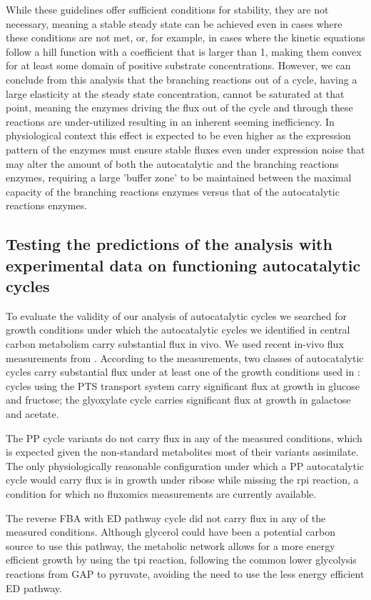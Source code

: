     While these guidelines offer sufficient conditions for stability, they are not necessary, meaning a stable steady state can be achieved even in cases where these conditions are not met, or, for example, in cases where the kinetic equations follow a hill function with a coefficient that is larger than 1, making them convex for at least some domain of positive substrate concentrations.
    However, we can conclude from this analysis that the branching reactions out of a cycle, having a large elasticity at the steady state concentration, cannot be saturated at that point, meaning the enzymes driving the flux out of the cycle and through these reactions are under-utilized resulting in an inherent seeming inefficiency.
    In physiological context this effect is expected to be even higher as the expression pattern of the enzymes must ensure stable fluxes even under expression noise that may alter the amount of both the autocatalytic and the branching reactions enzymes, requiring a large 'buffer zone' to be maintained between the maximal capacity of the branching reactions enzymes versus that of the autocatalytic reactions enzymes.

    \subsection{Testing the predictions of the analysis with experimental data on functioning autocatalytic cycles}
    To evaluate the validity of our analysis of autocatalytic cycles we searched for growth conditions under which the autocatalytic cycles we identified in central carbon metabolism carry substantial flux in vivo.
    We used recent in-vivo flux measurements from \cite{Gerosa2015-oq}.  
    According to the measurements, two classes of autocatalytic cycles carry substantial flux under at least one of the growth conditions used in \cite{Gerosa2015-oq}:
    cycles using the PTS transport system carry significant flux at growth in glucose and fructose;
    the glyoxylate cycle carries significant flux at growth in galactose and acetate.

    The PP cycle variants do not carry flux in any of the measured conditions, which is expected given the non-standard metabolites most of their variants assimilate.
    The only physiologically reasonable configuration under which a PP autocatalytic cycle would carry flux is in growth under ribose while missing the rpi reaction, a condition for which no fluxomics measurements are currently available.

    The reverse FBA with ED pathway cycle did not carry flux in any of the measured conditions.
    Although glycerol could have been a potential carbon source to use this pathway, the metabolic network allows for a more energy efficient growth by using the tpi reaction, following the common lower glycolysis reactions from GAP to pyruvate, avoiding the need to use the less energy efficient ED pathway.

